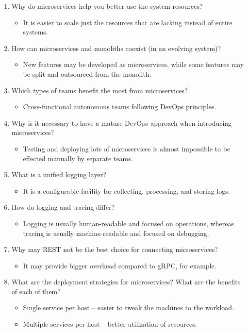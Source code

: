 \begin{enumerate}
\item
Why do microservices help you better use the system resources?
\begin{itemize}
\item 
It is easier to scale just the resources that are lacking instead of entire systems.
\end{itemize}

\item
How can microservices and monoliths coexist (in an evolving system)?
\begin{itemize}
\item 
New features may be developed as microservices, while some features may be split and outsourced from the monolith.
\end{itemize}

\item
Which types of teams benefit the most from microservices?
\begin{itemize}
\item 
Cross-functional autonomous teams following DevOps principles.
\end{itemize}

\item
Why is it necessary to have a mature DevOps approach when introducing microservices?
\begin{itemize}
\item 
Testing and deploying lots of microservices is almost impossible to be effected manually by separate teams.
\end{itemize}

\item
What is a unified logging layer?
\begin{itemize}
\item 
It is a configurable facility for collecting, processing, and storing logs.
\end{itemize}

\item
How do logging and tracing differ?
\begin{itemize}
\item 
Logging is usually human-readable and focused on operations, whereas tracing is usually machine-readable and focused on debugging.
\end{itemize}

\item
Why may REST not be the best choice for connecting microservices?
\begin{itemize}
\item 
It may provide bigger overhead compared to gRPC, for example.
\end{itemize}

\item
What are the deployment strategies for microservices? What are the benefits of each of them?
\begin{itemize}
\item 
Single service per host – easier to tweak the machines to the workload.

\item 
Multiple services per host – better utilization of resources.
\end{itemize}
\end{enumerate}